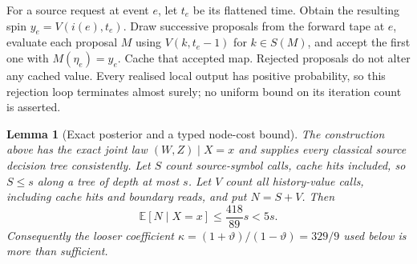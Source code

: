 \documentclass[11pt]{article}
\newtheorem{lemma}[theorem]{Lemma}
\theoremstyle{definition}\newtheorem{definition}[theorem]{Definition}
\theoremstyle{remark}\newtheorem{remark}[theorem]{Remark}
\newcommand{\E}{\mathbb E}\newcommand{\Prb}{\mathbb P}
\begin{document}
For a source request at event \(e\), let \(t_e\) be its flattened time. Obtain the resulting spin \(y_e=V(i(e),t_e)\). Draw successive proposals from the forward tape at \(e\), evaluate each proposal \(M\) using \(V(k,t_e-1)\) for \(k\in S(M)\), and accept the first one with \(M(\eta_e)=y_e\). Cache that accepted map. Rejected proposals do not alter any cached value. Every realised local output has positive probability, so this rejection loop terminates almost surely; no uniform bound on its iteration count is asserted.

\begin{lemma}[Exact posterior and a typed node-cost bound]\label{lem:work}
The construction above has the exact joint law \((W,Z)\mid X=x\) and supplies every classical source decision tree consistently. Let \(S\) count source-symbol calls, cache hits included, so \(S\le s\) along a tree of depth at most \(s\). Let \(V\) count all history-value calls, including cache hits and boundary reads, and put \(N=S+V\). Then
\[
 \E[N\mid X=x]\le\frac{418}{89}s<5s.
\]
Consequently the looser coefficient \(\kappa=(1+\vartheta)/(1-\vartheta)=329/9\) used below is more than sufficient.
\end{lemma}
\end{document}
